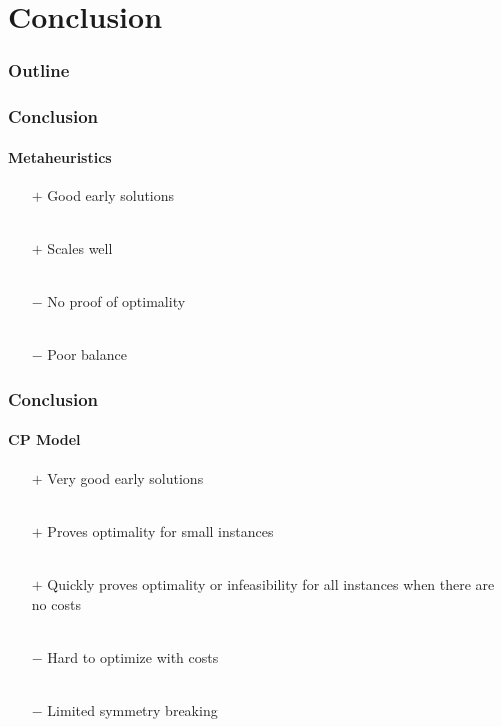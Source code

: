 \documentclass{beamer}
\newcommand{\AutoSectionTitle}{}
\begin{document}


\renewcommand{\AutoSectionTitle}{Conclusion}

\section{\AutoSectionTitle}

\begin{frame}
  \frametitle{Outline}
  \tableofcontents[currentsection]
\end{frame}




\begin{frame}
  \frametitle{\AutoSectionTitle}
  \framesubtitle{Metaheuristics}

  \begin{itemize}
  \item[$+$] Good early solutions \\~\\
  \item[$+$] Scales well \\~\\

    \pause
    
  \item[$-$] No proof of optimality \\~\\    
  \item[$-$] Poor balance
  \end{itemize}

\end{frame}




\begin{frame}
  \frametitle{\AutoSectionTitle}
  \framesubtitle{CP Model}

  \begin{itemize}
  \item[$+$] Very good early solutions \\~\\
  \item[$+$] Proves optimality for small instances \\~\\
  \item[$+$] Quickly proves optimality or infeasibility for all instances when there are no costs \\~\\

    \pause
    
  \item[$-$] Hard to optimize with costs \\~\\
  \item[$-$] Limited symmetry breaking
  \end{itemize}

\end{frame}
\end{document}

